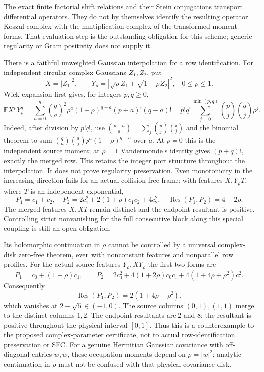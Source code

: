 \documentclass[11pt]{article}
\begin{document}
The exact finite factorial shift relations and their Stein conjugations
transport differential operators. They do not by themselves identify the
resulting operator Koszul complex with the multiplication complex of the
transformed moment forms. That evaluation step is the outstanding
obligation for this scheme; generic regularity or Gram positivity does
not supply it.

There is a faithful unweighted Gaussian interpolation for a row
identification. For independent circular complex Gaussians $Z_1,Z_2$,
put
\[
 X=|Z_1|^2,\qquad
 Y_\rho=|\sqrt\rho Z_1+\sqrt{1-\rho}Z_2|^2,\quad0\le\rho\le1.
\]
Wick expansion first gives, for integers $p,q\ge0$,
\[
 \mathbb E X^pY_\rho^q
 =\sum_{a=0}^q\binom qa^2\rho^a(1-\rho)^{q-a}(p+a)!(q-a)!
 =p!q!\sum_{j=0}^{\min(p,q)}\binom pj\binom qj\rho^j.
\]
Indeed, after division by $p!q!$, use
$\binom{p+a}{a}=\sum_j\binom pj\binom aj$ and the binomial theorem
to sum $\binom qa\binom aj\rho^a(1-\rho)^{q-a}$ over $a$.
At $\rho=0$ this is the independent source moment; at $\rho=1$
Vandermonde's identity gives $(p+q)!$, exactly the merged row.
This retains the integer port structure throughout the interpolation.
It does not prove regularity preservation. Even monotonicity in the
increasing direction fails for an actual collision-free frame:
with features $X,Y_\rho T$, where $T$ is an independent exponential,
\[
 P_1=c_1+c_2,\quad
 P_2=2c_1^2+2(1+\rho)c_1c_2+4c_2^2,\quad
 \operatorname{Res}(P_1,P_2)=4-2\rho.
\]
The merged features $X,XT$ remain distinct and the endpoint resultant
is positive. Controlling strict nonvanishing for the full consecutive
block along this special coupling is still an open obligation.

Its holomorphic continuation in $\rho$ cannot be controlled by a
universal complex-disk zero-free theorem, even with nonconstant
features and nonparallel row profiles. For the actual source features
$Y_\rho,XY_\rho$ the first two forms are
\[
 P_1=c_0+(1+\rho)c_1,\qquad
 P_2=2c_0^2+4(1+2\rho)c_0c_1
                  +4(1+4\rho+\rho^2)c_1^2.
\]
Consequently
\[
             \operatorname{Res}(P_1,P_2)=2(1+4\rho-\rho^2),
\]
which vanishes at $2-\sqrt5\in(-1,0)$.
The source columns $(0,1),(1,1)$ merge to the distinct columns $1,2$.
The endpoint resultants are $2$ and $8$; the resultant is positive
throughout the physical interval $[0,1]$. Thus this is a counterexample
to the proposed complex-parameter certificate, not to actual
row-identification preservation or SFC. For a genuine Hermitian
Gaussian covariance with off-diagonal entries $w,\overline w$, these
occupation moments depend on $\rho=|w|^2$; analytic continuation in
$\rho$ must not be confused with that physical covariance disk.
\end{document}

